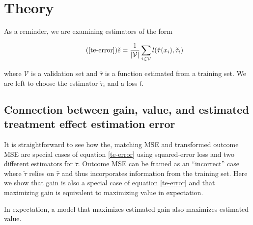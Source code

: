 \section{Theory}
\label{theory}

As a reminder, we are examining estimators of the form

\begin{equation}
\tag{\ref{te-error}}
\check e = \frac{1}{|\mathcal{V}|}\sum_{i \in \mathcal{V}} l(\hat \tau (x_i), \check \tau_i)
\end{equation}

where $\mathcal V$ is a validation set and $\hat\tau$ is a function estimated from a training set. We are left to choose the estimator $\check\tau_i$ and a loss $l$.

\subsection{Connection between gain, value, and estimated treatment effect estimation error}
\label{sec:gain-value}

It is straightforward to see how the, matching MSE and transformed outcome MSE are special cases of equation \ref{te-error} using squared-error loss and two different estimators for $\check\tau$. Outcome MSE can be framed as an ``incorrect'' case where $\check\tau$ relies on $\hat\tau$ and thus incorporates information from the training set. Here we show that gain is also a special case of equation \ref{te-error} and that maximizing gain is equivalent to maximizing value in expectation.

\begin{theorem}
\label{gain-value}
In expectation, a model that maximizes estimated gain also maximizes estimated value.
\end{theorem}

